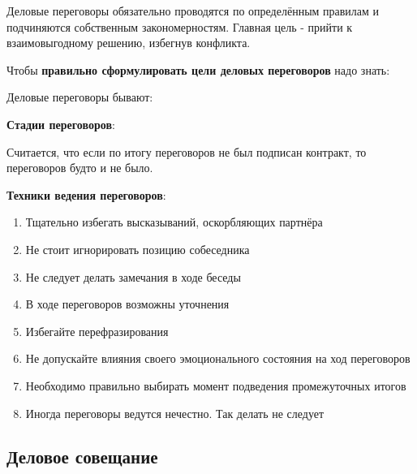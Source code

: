 \documentclass{article}
\begin{document}
Деловые переговоры обязательно проводятся по определённым правилам и подчиняются собственным закономерностям. Главная цель - прийти к взаимовыгодному решению, избегнув конфликта.

Чтобы \textbf{правильно сформулировать цели деловых переговоров} надо знать:

\begin{multienumerate}
\end{multienumerate}

Деловые переговоры бывают:

\begin{multienumerate}
\end{multienumerate}

\textbf{Стадии переговоров}:

\begin{multienumerate}
\end{multienumerate}

Считается, что если по итогу переговоров не был подписан контракт, то переговоров будто и не было.

\textbf{Техники ведения переговоров}:

\begin{enumerate}
    \item Тщательно избегать высказываний, оскорбляющих партнёра
    \item Не стоит игнорировать позицию собеседника
    \item Не следует делать замечания в ходе беседы
    \item В ходе переговоров возможны уточнения
    \item Избегайте перефразирования
    \item Не допускайте влияния своего эмоционального состояния на ход переговоров
    \item Необходимо правильно выбирать момент подведения промежуточных итогов
    \item Иногда переговоры ведутся нечестно. Так делать не следует
\end{enumerate}

\subsection{Деловое совещание}
\end{document}
